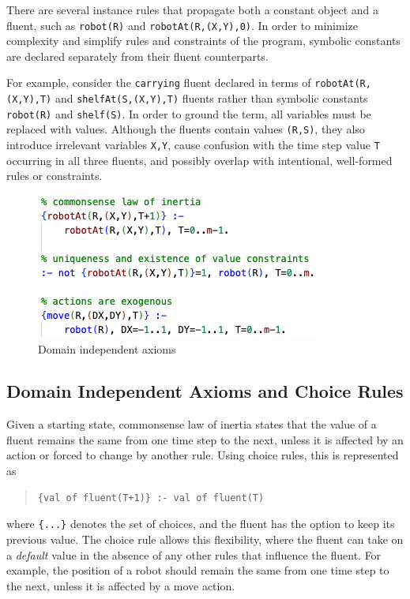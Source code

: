 \documentclass[letterpaper]{article}
\newcommand{\ct}[1]{\texttt{#1}}
\begin{document}
There are several instance rules that propagate both a constant object and a fluent, such as \ct{robot(R)} and \ct{robotAt(R,(X,Y),0)}. In order to minimize complexity and simplify rules and constraints of the program, symbolic constants are declared separately from their fluent counterparts.

For example, consider the \ct{carrying} fluent declared in terms of \ct{robotAt(R,(X,Y),T)} and \ct{shelfAt(S,(X,Y),T)} fluents rather than symbolic constants \ct{robot(R)} and \ct{shelf(S)}. In order to ground the term, all variables must be replaced with values. Although the fluents contain values \ct{(R,S)}, they also introduce irrelevant variables \ct{X,Y}, cause confusion with the time step value \ct{T} occurring in all three fluents, and possibly overlap with intentional, well-formed rules or constraints.

\begin{figure}[t]
    \centering
    \includegraphics[width=0.8\columnwidth]{axiom.png}
    \caption{Domain independent axioms}
    \label{fig2:image}
    \end{figure}

\subsection{Domain Independent Axioms and Choice Rules}

Given a starting state, commonsense law of inertia states that the value of a fluent remains the same from one time step to the next, unless it is affected by an action or forced to change by another rule. Using choice rules, this is represented as
\begin{quote}\begin{small}\begin{verbatim}
{val of fluent(T+1)} :- val of fluent(T)
\end{verbatim}\end{small}\end{quote}
where \ct{\{...\}} denotes the set of choices, and the fluent has the option to keep its previous value. The choice rule allows this flexibility, where the fluent can take on a \emph{default} value in the absence of any other rules that influence the fluent. For example, the position of a robot should remain the same from one time step to the next, unless it is affected by a move action.
\end{document}
